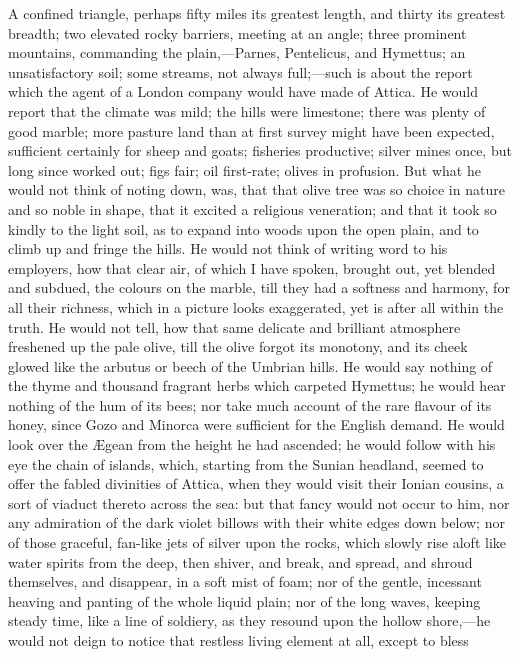 A confined triangle, perhaps fifty miles its greatest length, and
thirty its greatest breadth; two elevated rocky barriers, meeting at
an angle; three prominent mountains, commanding the plain,—Parnes,
Pentelicus, and Hymettus; an unsatisfactory soil; some streams,
not always full;—such is about the report which the agent of a
London company would have made of Attica. He would report that the
climate was mild; the hills were limestone; there was plenty of good
marble; more pasture land than at first survey might have been
expected, sufficient certainly for sheep and goats; fisheries
productive; silver mines once, but long since worked out; figs fair;
oil first-rate; olives in profusion. But what he would not think of
noting down, was, that that olive tree was so choice in nature and so
noble in shape, that it excited a religious veneration; and that it
took so kindly to the light soil, as to expand into woods upon the
open plain, and to climb up and fringe the hills. He would not think
of writing word to his employers, how that clear air, of which I have
spoken, brought out, yet blended and subdued, the colours on the
marble, till they had a softness and harmony, for all their richness,
which in a picture looks exaggerated, yet is after all within the
truth. He would not tell, how that same delicate and brilliant
atmosphere freshened up the pale olive, till the olive forgot its
monotony, and its cheek glowed like the arbutus or beech of the
Umbrian hills. He would say nothing of the thyme and thousand fragrant
herbs which carpeted Hymettus; he would hear nothing of the hum of its
bees; nor take much account of the rare flavour of its honey, since
Gozo and Minorca were sufficient for the English demand. He would look
over the Ægean from the height he had ascended; he would follow with
his eye the chain of islands, which, starting from the Sunian
headland, seemed to offer the fabled divinities of Attica, when they
would visit their Ionian cousins, a sort of viaduct thereto across the
sea: but that fancy would not occur to him, nor any admiration of
the dark violet billows with their white edges down below; nor of
those graceful, fan-like jets of silver upon the rocks, which slowly
rise aloft like water spirits from the deep, then shiver, and break,
and spread, and shroud themselves, and disappear, in a soft mist of
foam; nor of the gentle, incessant heaving and panting of the whole
liquid plain; nor of the long waves, keeping steady time, like a line
of soldiery, as they resound upon the hollow shore,—he would not
deign to notice that restless living element at all, except to bless

